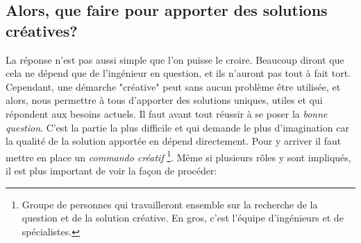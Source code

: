 \subsection{Alors, que faire pour apporter des solutions créatives?}

La réponse n'est pas aussi simple que l'on puisse le croire. Beaucoup diront que cela ne dépend que de l'ingénieur en question, et ils n'auront pas tout à fait tort. Cependant, une démarche "créative" peut sans aucun problème être utilisée, et alors, nous permettre à tous d'apporter des solutions uniques, utiles et qui répondent aux besoins actuels. Il faut avant tout réussir à se poser la \textit{bonne question}. C'est la partie la plus difficile et qui demande le plus d'imagination car la qualité de la solution apportée en dépend directement. Pour y arriver il faut mettre en place un \textit{commando créatif} \footnote{Groupe de personnes qui travailleront ensemble sur la recherche de la question et de la solution créative. En gros, c'est l’équipe d'ingénieurs et de spécialistes.}. Même si plusieurs rôles y sont impliqués, il est plus important de voir la façon de procéder:

